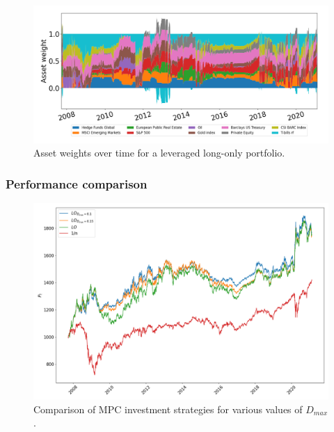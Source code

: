 \begin{figure}[H]
    \centering
    \includegraphics[width=1\textwidth]{analysis/portfolio_exercise/images/mle/weights_llo.png}
    \caption[Asset weights over time for a leveraged long-only portfolio]{Asset weights over time for a leveraged long-only portfolio.}
    \label{fig:MPC_port_weights_llo}
\end{figure}

\subsubsection*{Performance comparison}

\begin{figure}[H]
    \centering
    \includegraphics[width=1\textwidth]{analysis/portfolio_exercise/images/mle/port_vals_lo.png}
    \caption[Comparison of MPC investment strategies for various values of $D_{max}$]{Comparison of MPC investment strategies for various values of $D_{max}$.}
    \label{fig:MPC_port_vals_lo}
\end{figure}

